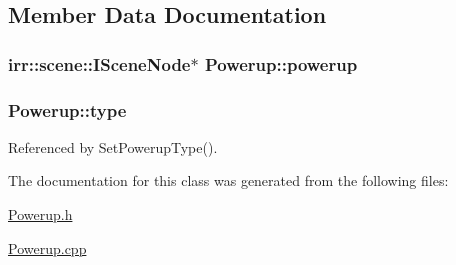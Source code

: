 \subsection{Member Data Documentation}
\hypertarget{class_powerup_a45107cde4eb55f37b7c3b21c3bf1c156}{
\subsubsection[{powerup}]{\setlength{\rightskip}{0pt plus 5cm}irr\-::scene\-::\-I\-Scene\-Node$\ast$ Powerup\-::powerup\hspace{0.3cm}{\ttfamily [private]}}}\label{class_powerup_a45107cde4eb55f37b7c3b21c3bf1c156}
\hypertarget{class_powerup_addc7f76821bf2505d35b85d3cf725a16}{
\subsubsection[{type}]{ Powerup\-::type\hspace{0.3cm}{\ttfamily [private]}}}\label{class_powerup_addc7f76821bf2505d35b85d3cf725a16}


Referenced by Set\-Powerup\-Type().



The documentation for this class was generated from the following files\-:\begin{DoxyCompactItemize}
\item 
\hyperlink{_powerup_8h}{Powerup.\-h}\item 
\hyperlink{_powerup_8cpp}{Powerup.\-cpp}\end{DoxyCompactItemize}
